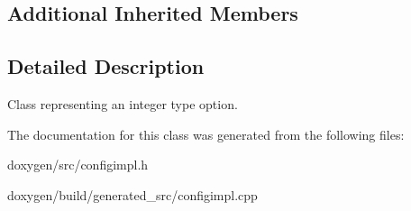 \subsection*{Additional Inherited Members}


\subsection{Detailed Description}
Class representing an integer type option. 

The documentation for this class was generated from the following files\+:\begin{DoxyCompactItemize}
\item 
doxygen/src/configimpl.\+h\item 
doxygen/build/generated\+\_\+src/configimpl.\+cpp\end{DoxyCompactItemize}
